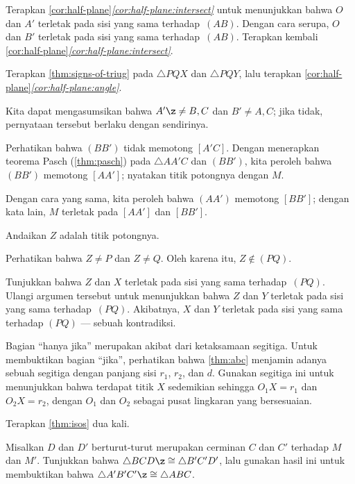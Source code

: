Terapkan \ref{cor:half-plane}\textit{\ref{cor:half-plane:intersect}} untuk menunjukkan bahwa $O$ dan $A'$
terletak pada sisi yang sama terhadap~$(AB)$.
Dengan cara serupa, $O$ dan $B'$ terletak pada sisi yang sama terhadap~$(AB)$.
Terapkan kembali \ref{cor:half-plane}\textit{\ref{cor:half-plane:intersect}}.

Terapkan \ref{thm:signs-of-triug} pada $\triangle PQX$ dan $\triangle PQY$, lalu
terapkan \ref{cor:half-plane}\textit{\ref{cor:half-plane:angle}}.

Kita dapat mengasumsikan bahwa $A'\z\ne B,C$ dan $B'\ne A, C$;
jika tidak, pernyataan tersebut berlaku dengan sendirinya.

Perhatikan bahwa $(BB')$ tidak memotong $[A'C]$.
Dengan menerapkan teorema Pasch (\ref{thm:pasch}) pada $\triangle AA'C$ dan $(BB')$, kita peroleh bahwa
$(BB')$ memotong $[AA']$; nyatakan titik potongnya dengan $M$.

Dengan cara yang sama, kita peroleh bahwa $(AA')$ memotong $[BB']$;
dengan kata lain, $M$ terletak pada $[AA']$ dan $[BB']$.

Andaikan $Z$ adalah titik potongnya.

Perhatikan bahwa $Z\ne P$ dan $Z\ne Q$.
Oleh karena itu, $Z\notin (PQ)$.

Tunjukkan bahwa $Z$ dan $X$ terletak pada sisi yang sama terhadap~$(PQ)$.
Ulangi argumen tersebut untuk menunjukkan bahwa $Z$ dan $Y$ terletak pada sisi yang sama terhadap~$(PQ)$.
Akibatnya, $X$ dan $Y$ terletak pada sisi yang sama terhadap $(PQ)$ --- sebuah kontradiksi.

 Bagian ``hanya jika'' merupakan akibat dari ketaksamaan segitiga.
Untuk membuktikan bagian ``jika'',
perhatikan bahwa \ref{thm:abc} menjamin adanya sebuah segitiga dengan panjang sisi $r_1$, $r_2$, dan $d$.
Gunakan segitiga ini untuk menunjukkan bahwa terdapat titik $X$ sedemikian sehingga $O_1X=r_1$ dan $O_2X=r_2$, dengan $O_1$ dan $O_2$ sebagai pusat lingkaran yang bersesuaian.

\setcounter{eqtn}{0}

Terapkan \ref{thm:isos} dua kali.

Misalkan $D$ dan $D'$ berturut-turut merupakan cerminan $C$ dan $C'$ terhadap $M$ dan $M'$.
Tunjukkan bahwa $\triangle BCD\z\cong \triangle B'C'D'$, lalu gunakan hasil ini untuk membuktikan bahwa $\triangle A' B' C'\z\cong\triangle A B C$.

